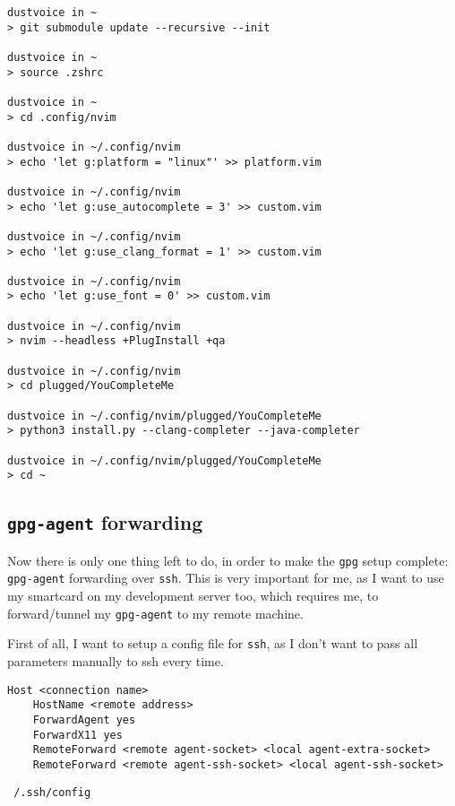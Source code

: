 \documentclass[10pt]{dustdoc}
\begin{document}
\begin{verbatim}
dustvoice in ~
> git submodule update --recursive --init

dustvoice in ~
> source .zshrc

dustvoice in ~
> cd .config/nvim

dustvoice in ~/.config/nvim
> echo 'let g:platform = "linux"' >> platform.vim

dustvoice in ~/.config/nvim
> echo 'let g:use_autocomplete = 3' >> custom.vim

dustvoice in ~/.config/nvim
> echo 'let g:use_clang_format = 1' >> custom.vim

dustvoice in ~/.config/nvim
> echo 'let g:use_font = 0' >> custom.vim

dustvoice in ~/.config/nvim
> nvim --headless +PlugInstall +qa

dustvoice in ~/.config/nvim
> cd plugged/YouCompleteMe

dustvoice in ~/.config/nvim/plugged/YouCompleteMe
> python3 install.py --clang-completer --java-completer

dustvoice in ~/.config/nvim/plugged/YouCompleteMe
> cd ~
\end{verbatim}


\subsection{\texttt{gpg-agent} forwarding}%
\label{sec:gpg-agent-forwarding}

Now there is only one thing left to do, in order to make the \texttt{gpg} setup complete: \texttt{gpg-agent} forwarding over \texttt{ssh}.
This is very important for me, as I want to use my smartcard on my development server too, which requires me, to forward/tunnel my \texttt{gpg-agent} to my remote machine.

First of all, I want to setup a config file for \texttt{ssh}, as I don’t want to pass all parameters manually to ssh every time.

\begin{mintedlisting}
    \begin{verbatim}
Host <connection name>
    HostName <remote address>
    ForwardAgent yes
    ForwardX11 yes
    RemoteForward <remote agent-socket> <local agent-extra-socket>
    RemoteForward <remote agent-ssh-socket> <local agent-ssh-socket>
    \end{verbatim}

    \caption{\texttt{~/.ssh/config}}
\end{mintedlisting}
\end{document}
